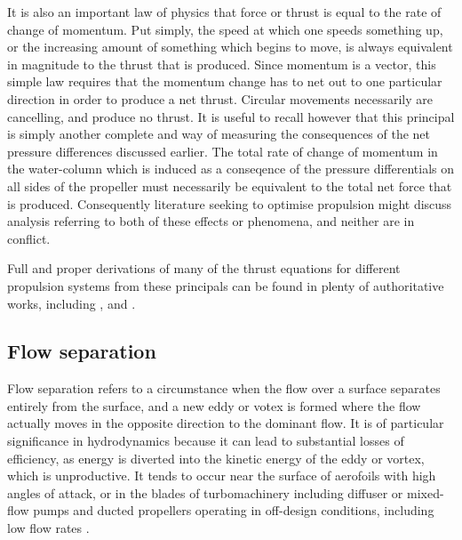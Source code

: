 \documentclass{article}\usepackage[]{graphicx}\usepackage[]{color}
\begin{document}
It is also an important law of physics that force or thrust is equal to the rate of change of momentum. Put simply, the speed at which one speeds something up, or the increasing amount of something which begins to move, is always equivalent in magnitude to the thrust that is produced.  Since momentum is a vector, this simple law requires that the momentum change has to net out to one particular direction in order to produce a net thrust.  Circular movements necessarily are cancelling, and produce no thrust. It is useful to recall however that this principal is simply another complete and way of measuring the consequences of the net pressure differences discussed earlier.  The total rate of change of momentum in the water-column which is induced as a conseqence of the pressure differentials on all sides of the propeller must necessarily be equivalent to the total net force that is produced.  Consequently literature seeking to optimise propulsion might discuss analysis referring to both of these effects or phenomena, and neither are in conflict.

Full and proper derivations of many of the thrust equations for different propulsion systems from these principals can be found in plenty of authoritative works, including \parencite{lewis1988}, \parencite{carlton2007} and \parencite{mollard2011}.

\subsection{Flow separation}

Flow separation refers to a circumstance when the flow over a surface separates entirely from the surface, and a new eddy or votex is formed where the flow actually moves in the opposite direction to the dominant flow.  It is of particular significance in hydrodynamics because it can lead to substantial losses of efficiency, as energy is diverted into the kinetic energy of the eddy or vortex, which is unproductive. It tends to occur near the surface of aerofoils with high angles of attack, or in the blades of turbomachinery including diffuser or mixed-flow pumps and ducted propellers operating in off-design conditions, including low flow rates \parencite{li2013}  \parencite{bakker2006} \parencite{mcbride1979} \parencite{wislicenus1986}.
\end{document}

